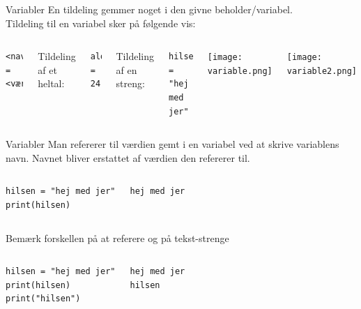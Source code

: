 \documentclass{beamer}
\begin{document}
\begin{frame}[fragile]{Variabler}
En tildeling gemmer noget i den givne beholder/variabel.\\
Tildeling til en variabel sker på følgende vis:
\begin{columns}
\begin{lstlisting}[style=python]
<navn> = <værdi>
\end{lstlisting}
Tildeling af et heltal:
\begin{lstlisting}[style=python]
alder = 24
\end{lstlisting}
Tildeling af en streng:
\begin{lstlisting}[style=python]
hilsen = "hej med jer"
\end{lstlisting}

\texttt{[image: variable.png]}

\texttt{[image: variable2.png]}
\end{columns}

\end{frame}

\begin{frame}[fragile]{Variabler}
Man refererer til værdien gemt i en variabel ved at skrive variablens navn. Navnet bliver erstattet af værdien den refererer til.

\begin{columns}
	\begin{lstlisting}[style=python]
hilsen = "hej med jer"
print(hilsen)
	\end{lstlisting}
	
	\begin{lstlisting}[style=python]
hej med jer
	\end{lstlisting}
	
\end{columns}

\pause
Bemærk forskellen på at referere og på tekst-strenge

\begin{columns}
	\begin{lstlisting}[style=python]
hilsen = "hej med jer"
print(hilsen)
print("hilsen")
	\end{lstlisting}
	
	\begin{lstlisting}[style=python]
hej med jer
hilsen
	\end{lstlisting}
	
\end{columns}

\end{frame}
\end{document}
